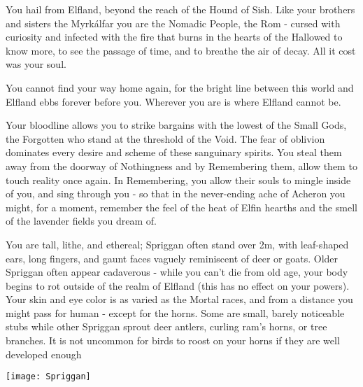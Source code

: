 {  
  
  You hail from Elfland, beyond the reach of the Hound of Sish.  Like your brothers and sisters the Myrkálfar you are the Nomadic People, the Rom - cursed with curiosity and infected with the fire that burns in the hearts of the Hallowed to know more, to see the passage of time, and to breathe the air of decay.  All it cost was your soul.  

  You cannot find your way home again, for the bright line between this world and Elfland ebbs forever before you.  Wherever you are is where Elfland cannot be.

  Your bloodline allows you to strike bargains with the lowest of the Small Gods, the Forgotten who stand at the threshold of the Void.  The fear of oblivion dominates every desire and scheme of these sanguinary spirits.  You steal them away from the doorway of Nothingness and by Remembering them, allow them to touch reality once again.  In Remembering, you allow their souls to mingle inside of you, and sing through you - so that in the never-ending ache of Acheron you might, for a moment, remember the feel of the heat of Elfin hearths and the smell of the lavender fields you dream of.  

  You are tall, lithe, and ethereal; Spriggan often stand over 2m, with leaf-shaped ears, long fingers, and gaunt faces vaguely reminiscent of deer or goats.  Older Spriggan often appear cadaverous - while you can't die from old age, your body begins to rot outside of the realm of Elfland (this has no effect on your powers).  Your skin and eye color is as varied as the Mortal races, and from a distance you might pass for human - except for the horns.  Some are small, barely noticeable stubs while other Spriggan sprout deer antlers, curling ram's horns, or tree branches.  It is not uncommon for birds to roost on your horns if they are well developed enough 

    \begin{center}
      \texttt{[image: Spriggan]}
    \end{center}


  



}
